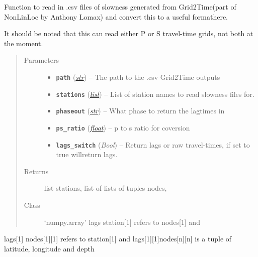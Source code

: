 \documentclass[a4paper,10pt,english]{sphinxmanual}
\begin{document}
\begin{fulllineitems}
\label{submodules/core.bright_lights:bright_lights._read_tt}
Function to read in .csv files of slowness generated from Grid2Time(part of NonLinLoc by Anthony Lomax) and convert this to a useful formathere.

It should be noted that this can read either P or S travel-time grids, not
both at the moment.
\begin{quote}\begin{description}
\item[{Parameters}] \leavevmode\begin{itemize}
\item {} 
\textbf{\texttt{path}} (\href{https://docs.python.org/library/functions.html\#str}{\emph{str}}) -- The path to the .csv Grid2Time outputs

\item {} 
\textbf{\texttt{stations}} (\href{https://docs.python.org/library/functions.html\#list}{\emph{list}}) -- List of station names to read slowness files for.

\item {} 
\textbf{\texttt{phaseout}} (\href{https://docs.python.org/library/functions.html\#str}{\emph{str}}) -- What phase to return the lagtimes in

\item {} 
\textbf{\texttt{ps\_ratio}} (\href{https://docs.python.org/library/functions.html\#float}{\emph{float}}) -- p to s ratio for coversion

\item {} 
\textbf{\texttt{lags\_switch}} (\emph{Bool}) -- Return lags or raw travel-times, if set to true willreturn lags.

\end{itemize}

\item[{Returns}] \leavevmode
list stations, list of lists of tuples nodes, 

\item[{Class}] \leavevmode
`numpy.array' lags station{[}1{]} refers to nodes{[}1{]} and 

\end{description}\end{quote}

lags{[}1{]} nodes{[}1{]}{[}1{]} refers to station{[}1{]} and lags{[}1{]}{[}1{]}nodes{[}n{]}{[}n{]} is a tuple of latitude, longitude and depth

\end{fulllineitems}
\end{document}
